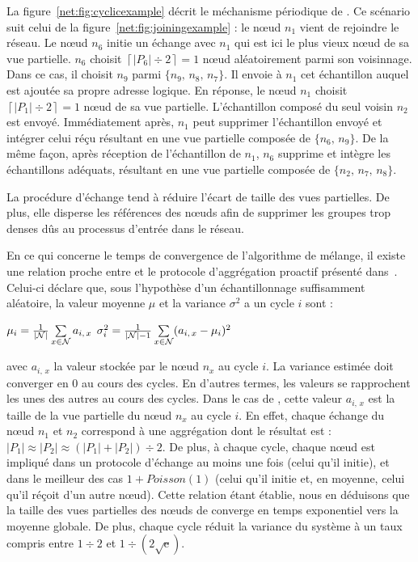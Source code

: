 La figure~\ref{net:fig:cyclicexample} décrit le méchanisme périodique de
\SPRAY. Ce scénario suit celui de la figure~\ref{net:fig:joiningexample} : le
nœud $n_1$ vient de rejoindre le réseau. Le nœud $n_6$ initie un échange avec
$n_1$ qui est ici le plus vieux nœud de sa vue partielle. $n_6$ choisit
$\left\lceil{|P_6|\div 2}\right\rceil = 1$ nœud aléatoirement parmi son
voisinnage. Dans ce cas, il choisit $n_9$ parmi $\{n_9,\,n_8,\,n_7\}$. Il envoie
à $n_1$ cet échantillon auquel est ajoutée sa propre adresse logique. En
réponse, le nœud $n_1$ choisit $\left\lceil{|P_1|\div 2}\right\rceil = 1$ nœud
de sa vue partielle. L'échantillon composé du seul voisin $n_2$ est
envoyé. Immédiatement après, $n_1$ peut supprimer l'échantillon envoyé et
intégrer celui réçu résultant en une vue partielle composée de $\{n_6,\, n_9\}$.
De la même façon, après réception de l'échantillon de $n_1$, $n_6$ supprime et
intègre les échantillons adéquats, résultant en une vue partielle composée de
$\{n_2,\,n_7,\,n_8\}$.

La procédure d'échange tend à réduire l'écart de taille des vues partielles. De
plus, elle disperse les références des nœuds afin de supprimer les groupes trop
denses dûs au processus d'entrée dans le réseau.

En ce qui concerne le temps de convergence de l'algorithme de mélange, il existe
une relation proche entre \SPRAY et le protocole d'aggrégation proactif
présenté dans~\cite{jelasity2004epidemic, montresor2004robust}. Celui-ci déclare
que, sous l'hypothèse d'un échantillonnage suffisamment aléatoire, la valeur
moyenne $\mu$ et la variance $\sigma^2$ a un cycle $i$ sont :
\begin{center}
  $\mu_i = {1\over{|\mathcal{N}|}} \sum\limits_{x \in \mathcal{N}} a_{i,\,x}$
  \hfill
  $\sigma^2_i = {1\over{|\mathcal{N}|-1}}\sum\limits_{x \in \mathcal{N}}
  (a_{i,\,x} - \mu_i)^2$
\end{center}
avec $a_{i,\,x}$ la valeur stockée par le nœud $n_x$ au cycle $i$. La variance
estimée doit converger en 0 au cours des cycles. En d'autres termes, les valeurs
se rapprochent les unes des autres au cours des cycles. Dans le cas de \SPRAY,
cette valeur $a_{i,\,x}$ est la taille de la vue partielle du nœud $n_x$ au
cycle $i$. En effet, chaque échange du nœud $n_1$ et $n_2$ correspond à une
aggrégation dont le résultat est :
$|P_1|\approx|P_2|\approx{(|P_1| + |P_2|) \div 2}$.  De plus, à chaque cycle,
chaque nœud est impliqué dans un protocole d'échange au moins une fois (celui
qu'il initie), et dans le meilleur des cas $1+Poisson(1)$ (celui qu'il initie
et, en moyenne, celui qu'il réçoit d'un autre nœud). Cette relation étant
établie, nous en déduisons que la taille des vues partielles des nœuds de \SPRAY
converge en temps exponentiel vers la moyenne globale. De plus, chaque cycle
réduit la variance du système à un taux compris entre ${1\div 2}$ et
$1\div ({2\sqrt{\text{e}}})$.

